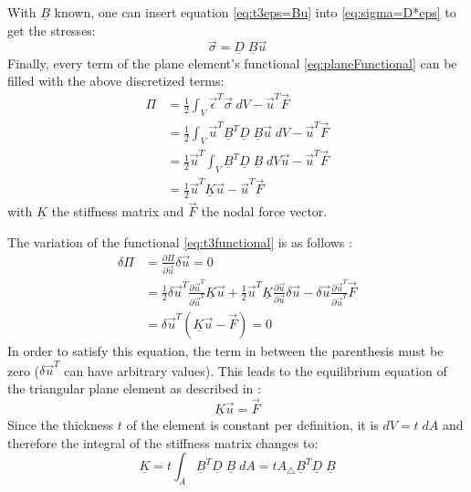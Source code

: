   With $\underline{B}$ known, one can insert equation \ref{eq:t3eps=Bu} into \ref{eq:sigma=D*eps} to get the stresses:
  \begin{equation} \label{eq:t3sigma=DBu}
  \vec{\sigma} = \underline{D}\;\underline{B} \vec{u}
  \end{equation}
  Finally, every term of the plane element's functional \ref{eq:planeFunctional} can be filled with the above discretized terms:
  \begin{align}\label{eq:t3functional}
  \Pi &= \frac{1}{2} \int_{V}\vec{\epsilon}^T\vec{\sigma}\;dV - \vec{u}^T \vec{F} \nonumber\\
      &= \frac{1}{2} \int_{V}\vec{u}^T \underline{B}^T\underline{D}\;\underline{B}\vec{u}\;dV - \vec{u}^T \vec{F} \nonumber\\
      &= \frac{1}{2} \vec{u}^T \int_{V} \underline{B}^T\underline{D}\;\underline{B}\;dV \vec{u}- \vec{u}^T \vec{F} \nonumber\\
      &= \frac{1}{2}\vec{u}^T \underline{K} \vec{u} - \vec{u}^T \vec{F}
  \end{align}
  with $\underline{K}$ the stiffness matrix and $\vec{F}$ the nodal force vector.
  
  The variation of the functional \ref{eq:t3functional} is as follows \cite{steinke2005finite}:
  \begin{align}
  \delta\Pi &= \frac{\partial\Pi}{\partial \vec{u}}\delta\vec{u} = 0 \nonumber\\
            &= \frac{1}{2}\delta\vec{u}^T\frac{\partial\vec{u}^T}{\partial\vec{u}^T}\underline{K}\vec{u} + \frac{1}{2}\vec{u}^T\underline{K}\frac{\partial\vec{u}}{\partial\vec{u}}\delta\vec{u} - \delta\vec{u}\frac{\partial\vec{u}^T}{\partial\vec{u}^T}\vec{F} \nonumber\\
            &= \delta\vec{u}^T\left(\underline{K}\vec{u}-\vec{F}\right) = 0
  \end{align}
  In order to satisfy this equation, the term in between the parenthesis must be zero ($\delta\vec{u}^T$ can have arbitrary values). This leads to the equilibrium equation of the triangular plane element as described in \cite{steinke2005finite}:
  \begin{equation}
  \underline{K}\vec{u} = \vec{F}
  \end{equation}
  Since the thickness $t$ of the element is constant per definition, it is $dV = t\;dA$ and therefore the integral of the stiffness matrix changes to:
  \begin{equation}
  \underline{K} = t \int_A \underline{B}^T\underline{D}\;\underline{B}\;dA = t A_\triangle \underline{B}^T\underline{D}\;\underline{B}
  \end{equation}
  
